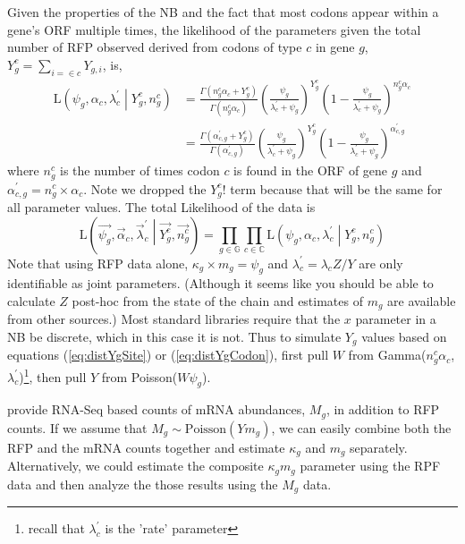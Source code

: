 \documentclass{article}
\newcommand{\alphac}{\ensuremath{{\alpha_c}}\xspace}
\newcommand{\alphacgprime}{\ensuremath{{\alpha_{c,g}^\prime}}\xspace}
\newcommand{\alphacvec}{\ensuremath{{\vec{\alpha}_c}}\xspace}
\newcommand{\lambdac}{\ensuremath{{\lambda_c}}\xspace}
\newcommand{\lambdacprime}{\ensuremath{{\lambda_c^\prime}}\xspace}
\newcommand{\lambdacprimevec}{\ensuremath{{\vec{\lambda}_c^\prime}}\xspace}
\newcommand{\ngc}{\ensuremath{{n_{g}^c}}\xspace}
\newcommand{\mg}{\ensuremath{{m_g}}\xspace}
\newcommand{\Mg}{\ensuremath{{M_g}}\xspace}
\newcommand{\psig}{\ensuremath{{\psi_g}}\xspace}
\newcommand{\kappag}{\ensuremath{{\kappa_{g}}}\xspace}
\newcommand{\Ztheta}{\ensuremath{{Z}}\xspace}
\newcommand{\Yg}{\ensuremath{{Y_{g}}}\xspace}
\newcommand{\Ytotal}{\ensuremath{{Y}}\xspace}
\newcommand{\Ygi}{\ensuremath{{Y_{g,i}}}\xspace}
\newcommand{\Ygc}{\ensuremath{{Y_{g}^c}}\xspace}
\newcommand{\Lik}{\ensuremath{\text{L}}\xspace}
\newcommand{\setG}{\ensuremath{\mathbb{G}}\xspace}
\newcommand{\setC}{\ensuremath{\mathbb{C}}\xspace}
\newcommand{\Ygcvec}{\ensuremath{{\Vec{\Ygc}}}\xspace}
\newcommand{\ngcvec}{\ensuremath{{\Vec{\ngc}}}\xspace}
\newcommand{\psigvec}{\ensuremath{{\Vec{\psig}}}\xspace}
\begin{document}
Given the properties of the NB \citep[p.~141]{ForbesEtAl2011} and the fact that most codons appear within a gene's ORF multiple times, the likelihood of the parameters given the total number of RFP observed derived from codons of type $c$ in gene $g$, $\Ygc = \sum_{i=\in c} \Ygi$, is,
\begin{align}
  \Lik\left(\psig, \alphac, \lambdacprime \middle| \Ygc, \ngc\right) &= \frac{\Gamma\left(\ngc \alphac + \Ygc\right)}{\Gamma\left(\ngc \alphac\right) } 
  \left(\frac{\psig}{\lambdacprime + \psig}\right)^\Ygc \left(1-\frac{\psig}{\lambdacprime + \psig}\right)^{\ngc \alphac}\\
\label{eq:distYgCodon}&= \frac{\Gamma\left(\alphacgprime + \Ygc\right)}{\Gamma\left(\alphacgprime\right)} 
  \left(\frac{\psig}{\lambdacprime + \psig}\right)^\Ygc \left(1-\frac{\psig}{\lambdacprime + \psig}\right)^{\alphacgprime}
\end{align}
where $\ngc$ is the number of times codon $c$ is found in the ORF of gene $g$ and $\alphacgprime = \ngc \times \alphac$.
Note we dropped the $\Ygc!$ term because that will be the same for all parameter values.
The total Likelihood of the data is
\begin{equation}
  \Lik\left(\psigvec, \alphacvec, \lambdacprimevec \middle| \Ygcvec, \ngcvec\right) = \prod_{g \in \setG} \prod_{c \in \setC}  \Lik\left(\psig, \alphac, \lambdacprime \middle| \Ygc, \ngc\right)
\end{equation}
Note that using RFP data alone, $\kappag \times \mg = \psig$ and $\lambdacprime = \lambdac \Ztheta/\Ytotal$ are only identifiable as joint parameters. 
(Although it seems like you should be able to calculate \Ztheta post-hoc from the state of the chain and estimates of \mg are available from other sources.)
Most standard libraries require that the $x$ parameter in a NB be discrete, which in this case it is not.
Thus to simulate \Yg values based on equations (\ref{eq:distYgSite}) or (\ref{eq:distYgCodon}), first pull $W$ from Gamma(\ngc \alphac, \lambdacprime)\footnote{recall that \lambdacprime is the 'rate' parameter}, then pull $Y$ from Poisson($W \psig$).
  
\citet{PopEtAl2014} provide RNA-Seq based counts of mRNA abundances, \Mg, in addition to RFP counts.
If we assume that $\Mg \sim \text{Poisson}(\Ytotal \mg)$, we can easily combine both the RFP and the mRNA counts together and estimate $\kappag$ and $\mg$ separately.
Alternatively, we could estimate the composite \kappag \mg parameter using the RPF data and then analyze the those results using the \Mg data.
\end{document}
